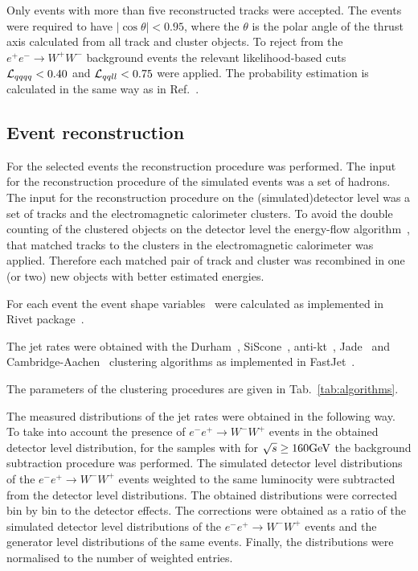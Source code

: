 Only events with more than five reconstructed tracks were accepted.
The events were required to have $|\cos\theta|<0.95$, where the  
$\theta$ is the polar angle of the thrust axis calculated from all track
and cluster objects.
To reject from the $e^+e^-\rightarrow W^+W^-$ background events the relevant likelihood-based cuts ${\cal L}_{qqqq}<0.40$ and 
${\cal L}_{qqll}<0.75$ were applied.
The probability estimation is  calculated in the same way as in Ref.~\cite{Abbiendi:2000eg}.

\subsection{Event reconstruction}
\label{sec:reconstruction}
For the selected events the reconstruction procedure was performed.
The input for the reconstruction procedure of  the simulated events
was a set of hadrons.
The input for the reconstruction procedure on the (simulated)detector level
 was a set of tracks and the electromagnetic calorimeter clusters.
To avoid the double counting of the clustered objects on the detector level the energy-flow 
algorithm~\cite{Ackerstaff:1997nga,Abbiendi:1999sy}, that matched tracks to the 
 clusters in the electromagnetic calorimeter was applied. Therefore  each 
 matched pair of track and cluster  was recombined in one (or two) new objects with better estimated energies.

For each event the event shape variables~\cite{OPAL:2011aa} 
were calculated  as  implemented in Rivet package~\cite{Buckley:2010ar}.

The jet rates were obtained with the Durham~\cite{Catani:1991hj}, SiScone~\cite{Cacciari:2005hq}, anti-kt~\cite{Cacciari:2008gp}, Jade~\cite{Bartel:1986ua}
  and Cambridge-Aachen~\cite{Dokshitzer:1997in}
clustering algorithms as implemented in FastJet~\cite{Cacciari:2011ma}.

The parameters of the clustering procedures are given in Tab.~\ref{tab:algorithms}.
\TABalgorithms

The measured distributions of the jet rates were obtained in the following way.
To take into account the presence of $e^-e^+ \rightarrow W^-W^+$ events in the 
obtained detector level distribution, for the samples with for $\sqrt{s}\ge 160{\text{Ge}\kern-0.06667em\text{V\/}}$ the background subtraction procedure was performed. 
The simulated detector level distributions of the $e^-e^+ \rightarrow W^-W^+$ events 
weighted to the same luminocity were subtracted from the detector level distributions.
The obtained distributions were corrected bin by bin to the detector effects. 
The corrections were obtained as a ratio of 
the simulated detector level distributions of the $e^-e^+ \rightarrow W^-W^+$ events 
and the generator level distributions of the same events.
Finally, the  distributions were normalised to the number of weighted entries.

